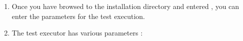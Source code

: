 
\begin{enumerate}
\item Once you have browsed to the  installation directory and entered , you can enter the parameters for the test execution.
\item The test executor has various parameters :

\clearpage

\label{cmdlineparams}
\begin{supertabular}{|p{3.0cm}p{8.0cm}|}
\hline


\end{supertabular}
\end{enumerate}
